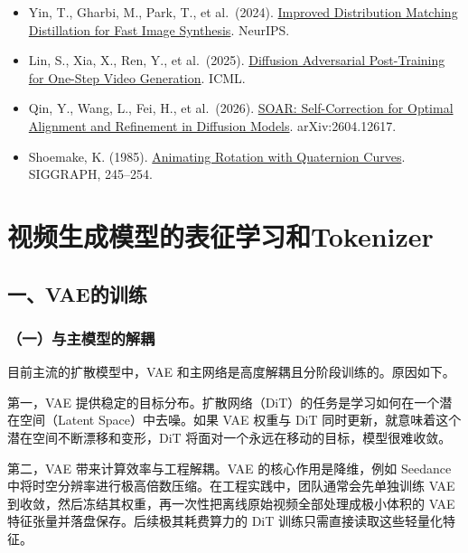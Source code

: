\begin{itemize}
\item
  Yin, T., Gharbi, M., Park, T., et al.~(2024). \href{https://arxiv.org/abs/2405.14867}{Improved Distribution Matching Distillation for Fast Image Synthesis}. NeurIPS.
\item
  Lin, S., Xia, X., Ren, Y., et al.~(2025). \href{https://arxiv.org/abs/2501.08316}{Diffusion Adversarial Post-Training for One-Step Video Generation}. ICML.
\item
  Qin, Y., Wang, L., Fei, H., et al.~(2026). \href{https://arxiv.org/abs/2604.12617}{SOAR: Self-Correction for Optimal Alignment and Refinement in Diffusion Models}. arXiv:2604.12617.
\item
  Shoemake, K. (1985). \href{https://doi.org/10.1145/325334.325242}{Animating Rotation with Quaternion Curves}. SIGGRAPH, 245--254.
\end{itemize}

\clearpage

\hypertarget{ux89c6ux9891ux751fux6210ux6a21ux578bux7684ux8868ux5f81ux5b66ux4e60ux548ctokenizer}{%
\section{视频生成模型的表征学习和Tokenizer}\label{ux89c6ux9891ux751fux6210ux6a21ux578bux7684ux8868ux5f81ux5b66ux4e60ux548ctokenizer}}

\hypertarget{ux4e00vaeux7684ux8badux7ec3}{%
\subsection{一、VAE的训练}\label{ux4e00vaeux7684ux8badux7ec3}}

\hypertarget{ux4e00ux4e0eux4e3bux6a21ux578bux7684ux89e3ux8026}{%
\subsubsection{（一）与主模型的解耦}\label{ux4e00ux4e0eux4e3bux6a21ux578bux7684ux89e3ux8026}}

目前主流的扩散模型中，VAE 和主网络是高度解耦且分阶段训练的。原因如下。

第一，VAE 提供稳定的目标分布。扩散网络（DiT）的任务是学习如何在一个潜在空间（Latent Space）中去噪。如果 VAE 权重与 DiT 同时更新，就意味着这个潜在空间不断漂移和变形，DiT 将面对一个永远在移动的目标，模型很难收敛。

第二，VAE 带来计算效率与工程解耦。VAE 的核心作用是降维，例如 Seedance 中将时空分辨率进行极高倍数压缩。在工程实践中，团队通常会先单独训练 VAE 到收敛，然后冻结其权重，再一次性把离线原始视频全部处理成极小体积的 VAE 特征张量并落盘保存。后续极其耗费算力的 DiT 训练只需直接读取这些轻量化特征。

